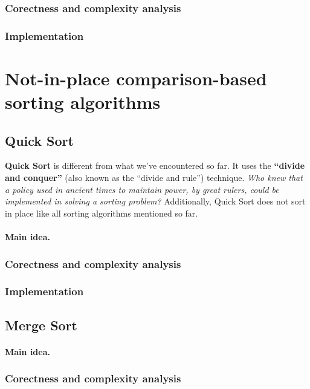 \documentclass[a4paper]{article}
\begin{document}
                \subsubsection*{Corectness and complexity analysis}
                \subsubsection*{Implementation}
        
        \newpage
        \section{Not-in-place comparison-based sorting algorithms}
            \subsection{Quick Sort}
            \textbf{Quick Sort} is different from what we've encountered so far. 
            It uses the \textbf{“divide and conquer”} 
            (also known as the “divide and rule”) 
            technique. \textit{Who knew that a policy used in ancient times to maintain power, 
            by great rulers, could be implemented in solving a sorting problem?}
            Additionally, Quick Sort does not sort in place like all sorting algorithms mentioned so far.
            
            \paragraph{Main idea.}
            \subsubsection*{Corectness and complexity analysis}
            \subsubsection*{Implementation}

            \subsection{Merge Sort}
                \paragraph{Main idea.}
                \subsubsection*{Corectness and complexity analysis}
\end{document}
